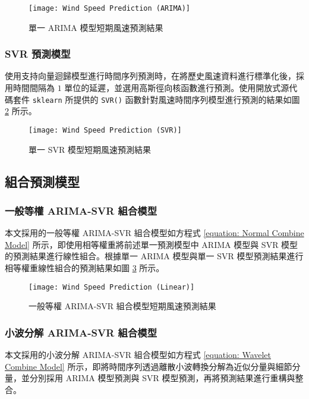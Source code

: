 \begin{figure}[h]
  \centering
  \texttt{[image: Wind Speed Prediction (ARIMA)]}
  \caption{單一 ARIMA 模型短期風速預測結果}
  \label{figure: Wind Speed Prediction ARIMA}
\end{figure}

\subsubsection{SVR 預測模型}

使用支持向量迴歸模型進行時間序列預測時，在將歷史風速資料進行標準化後，採用時間間隔為 $1$ 單位的延遲，並選用高斯徑向核函數進行預測。使用開放式源代碼套件 \texttt{sklearn} 所提供的 \texttt{SVR()} 函數針對風速時間序列模型進行預測的結果如圖 \ref{figure: Wind Speed Prediction SVR} 所示。

\begin{figure}[h]
  \centering
  \texttt{[image: Wind Speed Prediction (SVR)]}
  \caption{單一 SVR 模型短期風速預測結果}
  \label{figure: Wind Speed Prediction SVR}
\end{figure}

\subsection{組合預測模型}

\subsubsection{一般等權 ARIMA-SVR 組合模型}

本文採用的一般等權 ARIMA-SVR 組合模型如方程式 \eqref{equation: Normal Combine Model} 所示，即使用相等權重將前述單一預測模型中 ARIMA 模型與 SVR 模型的預測結果進行線性組合。根據單一 ARIMA 模型與單一 SVR 模型預測結果進行相等權重線性組合的預測結果如圖 \ref{figure: Wind Speed Prediction Linear} 所示。

\begin{figure}[h]
  \centering
  \texttt{[image: Wind Speed Prediction (Linear)]}
  \caption{一般等權 ARIMA-SVR 組合模型短期風速預測結果}
  \label{figure: Wind Speed Prediction Linear}
\end{figure}

\subsubsection{小波分解 ARIMA-SVR 組合模型}

本文採用的小波分解 ARIMA-SVR 組合模型如方程式 \eqref{equation: Wavelet Combine Model} 所示，即將時間序列透過離散小波轉換分解為近似分量與細節分量，並分別採用 ARIMA 模型預測與 SVR 模型預測，再將預測結果進行重構與整合。

